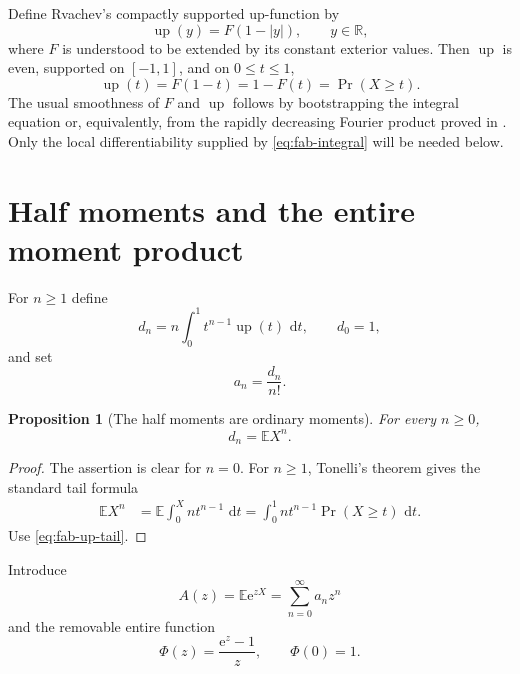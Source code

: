 \documentclass[11pt,oneside,openany]{book}
\newtheorem{proposition}[theorem]{Proposition}
\theoremstyle{definition}
\theoremstyle{remark}
\newcommand{\R}{\mathbb R}
\newcommand{\e}{\mathrm e}
\newcommand{\dd}{\,\mathrm d}
\newcommand{\Up}{\operatorname{up}}
\begin{document}
Define Rvachev's compactly supported up-function by
\begin{equation}
 \Up(y)=F(1-|y|),\qquad y\in\R,
 \label{eq:fab-up}
\end{equation}
where $F$ is understood to be extended by its constant exterior values.  Then $\Up$ is even, supported on $[-1,1]$, and on $0\le t\le1$,
\begin{equation}
 \Up(t)=F(1-t)=1-F(t)=\Pr(X\ge t).
 \label{eq:fab-up-tail}
\end{equation}
The usual smoothness of $F$ and $\Up$ follows by bootstrapping the integral equation or, equivalently, from the rapidly decreasing Fourier product proved in .  Only the local differentiability supplied by \eqref{eq:fab-integral} will be needed below.

\section{Half moments and the entire moment product}

For $n\ge1$ define
\begin{equation}
 d_n=n\int_0^1 t^{n-1}\Up(t)\,\dd t,
 \qquad d_0=1,
 \label{eq:fab-dn}
\end{equation}
and set
\begin{equation}
 a_n=\frac{d_n}{n!}.
 \label{eq:fab-an}
\end{equation}

\begin{proposition}[The half moments are ordinary moments]\label{prop:fab-tail-moments}
For every $n\ge0$,
\[
 d_n=\mathbb E X^n.
\]
\end{proposition}

\begin{proof}
The assertion is clear for $n=0$.  For $n\ge1$, Tonelli's theorem gives the standard tail formula
\begin{align*}
 \mathbb E X^n
 &=\mathbb E\int_0^X nt^{n-1}\,\dd t
 =\int_0^1nt^{n-1}\Pr(X\ge t)\,\dd t.
\end{align*}
Use \eqref{eq:fab-up-tail}.
\end{proof}

Introduce
\begin{equation}
 A(z)=\mathbb E\e^{zX}=\sum_{n=0}^{\infty}a_nz^n
 \label{eq:fab-A}
\end{equation}
and the removable entire function
\begin{equation}
 \Phi(z)=\frac{\e^z-1}{z},\qquad \Phi(0)=1.
 \label{eq:fab-Phi}
\end{equation}
\end{document}

